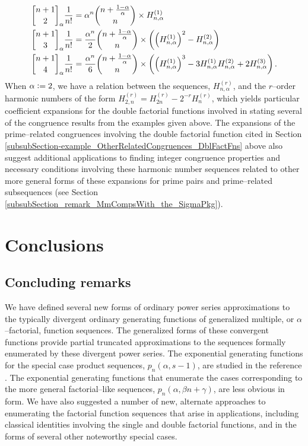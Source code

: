 \documentclass[12pt,reqno]{article}
\numberwithin{sfootnote}{section}
\numberwithin{equation}{section}
\theoremstyle{plain}
\theoremstyle{definition}
\theoremstyle{remark}
\newcommand{\defequals}{\ensuremath{\vcentcolon=}}
\newcommand{\gkpSI}[2]{\ensuremath{\genfrac{\lbrack}{\rbrack}{0pt}{}{#1}{#2}}}
\newcommand{\FcfII}[3]{\ensuremath{\gkpSI{#2}{#3}_{#1}}}
\begin{document}
\begin{align*} 
\FcfII{\alpha}{n+1}{2} \frac{1}{n!} & = 
     \alpha^{n} \binom{n+\frac{1-\alpha}{\alpha}}{n} \times 
     H_{n,\alpha}^{(1)} \\ 
\FcfII{\alpha}{n+1}{3} \frac{1}{n!} & = 
     \frac{\alpha^{n}}{2} \binom{n+\frac{1-\alpha}{\alpha}}{n} \times \left( 
     \left(H_{n,\alpha}^{(1)}\right)^{2} - H_{n,\alpha}^{(2)} 
     \right) \\ 
\FcfII{\alpha}{n+1}{4} \frac{1}{n!} & = 
     \frac{\alpha^{n}}{6} \binom{n+\frac{1-\alpha}{\alpha}}{n} \times \left( 
     \left(H_{n,\alpha}^{(1)}\right)^{3} - 
     3 H_{n,\alpha}^{(1)} H_{n,\alpha}^{(2)} + 
     2 H_{n,\alpha}^{(3)} 
     \right). 
\end{align*} 
When $\alpha \defequals 2$, we have a relation between the 
sequences, $H_{n,\alpha}^{(r)}$, and the $r$--order harmonic numbers of the 
form $H_{2,n}^{(r)} = H_{2n}^{(r)} - 2^{-r} H_n^{(r)}$, which yields 
particular coefficient expansions for the double factorial 
functions involved in stating several of the 
congruence results from the examples given above. 
The expansions of the prime--related congruences involving the 
double factorial function cited in 
Section \ref{subsubSection-example_OtherRelatedCongruences_DblFactFns} 
above also suggest additional applications to finding 
integer congruence properties and necessary conditions 
involving these harmonic number sequences related to other more general 
forms of these expansions for prime pairs and prime--related subsequences 
(see 
Section \ref{subsubSection_remark_MmCompsWith_the_SigmaPkg}). 

\section{Conclusions} 
\label{Section_ConcludingRemarks} 

\subsection{Concluding remarks} 

We have defined several new forms of 
ordinary power series approximations to the 
typically divergent ordinary generating functions of 
generalized multiple, or $\alpha$--factorial, function sequences. 
The generalized forms of these convergent functions 
provide partial truncated approximations to the sequences formally 
enumerated by these divergent power series. 
The exponential generating functions for the 
special case product sequences, $p_n(\alpha, s-1)$, 
are studied in the reference \citep[\S 5]{MULTIFACTJIS}. 
The exponential generating functions that enumerate the 
cases corresponding to the more general factorial--like sequences, 
$p_n(\alpha, \beta n + \gamma)$, are less obvious in form. 
We have also suggested a number of new, alternate 
approaches to enumerating the factorial function sequences that arise 
in applications, including 
classical identities involving the single and double factorial functions, and 
in the forms of several other noteworthy special cases. 
\end{document}
